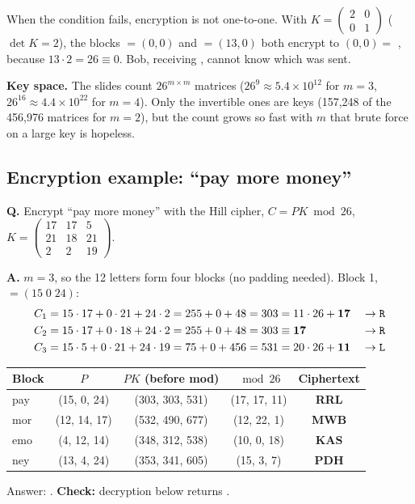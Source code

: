 When the condition fails, encryption is not one-to-one. With $K = \begin{pmatrix}2&0\\0&1\end{pmatrix}$ ($\det K = 2$), the blocks  $= (0, 0)$ and  $= (13, 0)$ both encrypt to $(0, 0) = $ , because $13 \cdot 2 = 26 \equiv 0$. Bob, receiving , cannot know which was sent.

\textbf{Key space.} The slides count $26^{m \times m}$ matrices ($26^9 \approx 5.4 \times 10^{12}$ for $m = 3$, $26^{16} \approx 4.4 \times 10^{22}$ for $m = 4$). Only the invertible ones are keys (157{,}248 of the 456{,}976 matrices for $m = 2$), but the count grows so fast with $m$ that brute force on a large key is hopeless.

\subsection{Encryption example: ``pay more money''}
\begin{worked}
\textbf{Q.} Encrypt ``pay more money'' with the Hill cipher, $C = PK \bmod 26$, \;$K = \begin{pmatrix}17&17&5\\21&18&21\\2&2&19\end{pmatrix}$.

\textbf{A.} $m = 3$, so the 12 letters form four blocks  (no padding needed). Block 1,  $= (15\;0\;24)$:
\[
\begin{aligned}
C_1 &= 15\cdot17 + 0\cdot21 + 24\cdot2 = 255+0+48 = 303 = 11\cdot26 + \mathbf{17} &&\to \texttt{R}\\
C_2 &= 15\cdot17 + 0\cdot18 + 24\cdot2 = 255+0+48 = 303 \equiv \mathbf{17} &&\to \texttt{R}\\
C_3 &= 15\cdot5 + 0\cdot21 + 24\cdot19 = 75+0+456 = 531 = 20\cdot26 + \mathbf{11} &&\to \texttt{L}
\end{aligned}
\]
\begin{center}\small
\begin{tabular}{@{}lcccc@{}}
\toprule
Block & $P$ & $PK$ (before mod) & $\bmod 26$ & Ciphertext\\
\midrule
pay & (15, 0, 24) & (303, 303, 531) & (17, 17, 11) & \textbf{RRL}\\
mor & (12, 14, 17) & (532, 490, 677) & (12, 22, 1) & \textbf{MWB}\\
emo & (4, 12, 14) & (348, 312, 538) & (10, 0, 18) & \textbf{KAS}\\
ney & (13, 4, 24) & (353, 341, 605) & (15, 3, 7) & \textbf{PDH}\\
\bottomrule
\end{tabular}
\end{center}
Answer: \textbf{}. \textbf{Check:} decryption below returns .
\end{worked}

